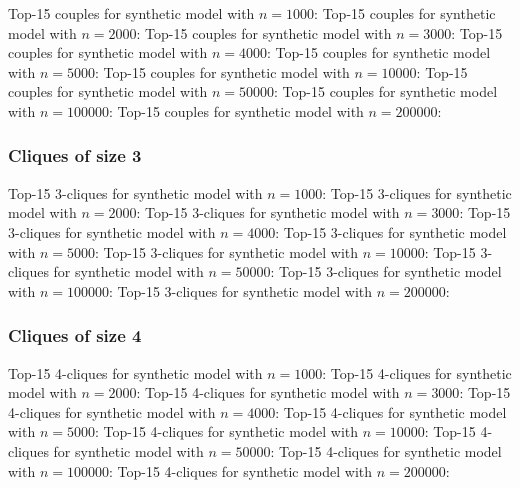 \documentclass[a4paper,11pt]{article}
\newcommand{\qr}[3]{\noindent{}Top-15 #2 for #3:{\scriptsize}}
\begin{document}
\qr{synth-1000.query.couples}{couples}{synthetic model with \(n=1000\)}
\qr{synth-2000.query.couples}{couples}{synthetic model with \(n=2000\)}
\qr{synth-3000.query.couples}{couples}{synthetic model with \(n=3000\)}
\qr{synth-4000.query.couples}{couples}{synthetic model with \(n=4000\)}
\qr{synth-5000.query.couples}{couples}{synthetic model with \(n=5000\)}
\qr{synth-10000.query.couples}{couples}{synthetic model with \(n=10000\)}
\qr{synth-50000.query.couples}{couples}{synthetic model with \(n=50000\)}
\qr{synth-100000.query.couples}{couples}{synthetic model with \(n=100000\)}
\qr{synth-200000.query.couples}{couples}{synthetic model with \(n=200000\)}

\newpage
\subsubsection{Cliques of size 3}

\qr{synth-1000.query.3cliques}{3-cliques}{synthetic model with \(n=1000\)}
\qr{synth-2000.query.3cliques}{3-cliques}{synthetic model with \(n=2000\)}
\qr{synth-3000.query.3cliques}{3-cliques}{synthetic model with \(n=3000\)}
\qr{synth-4000.query.3cliques}{3-cliques}{synthetic model with \(n=4000\)}
\qr{synth-5000.query.3cliques}{3-cliques}{synthetic model with \(n=5000\)}
\qr{synth-10000.query.3cliques}{3-cliques}{synthetic model with \(n=10000\)}
\qr{synth-50000.query.3cliques}{3-cliques}{synthetic model with \(n=50000\)}
\qr{synth-100000.query.3cliques}{3-cliques}{synthetic model with \(n=100000\)}
\qr{synth-200000.query.3cliques}{3-cliques}{synthetic model with \(n=200000\)}

\newpage
\subsubsection{Cliques of size 4}

\qr{synth-1000.query.4cliques}{4-cliques}{synthetic model with \(n=1000\)}
\qr{synth-2000.query.4cliques}{4-cliques}{synthetic model with \(n=2000\)}
\qr{synth-3000.query.4cliques}{4-cliques}{synthetic model with \(n=3000\)}
\qr{synth-4000.query.4cliques}{4-cliques}{synthetic model with \(n=4000\)}
\qr{synth-5000.query.4cliques}{4-cliques}{synthetic model with \(n=5000\)}
\qr{synth-10000.query.4cliques}{4-cliques}{synthetic model with \(n=10000\)}
\qr{synth-50000.query.4cliques}{4-cliques}{synthetic model with \(n=50000\)}
\qr{synth-100000.query.4cliques}{4-cliques}{synthetic model with \(n=100000\)}
\qr{synth-200000.query.4cliques}{4-cliques}{synthetic model with \(n=200000\)}
\end{document}
